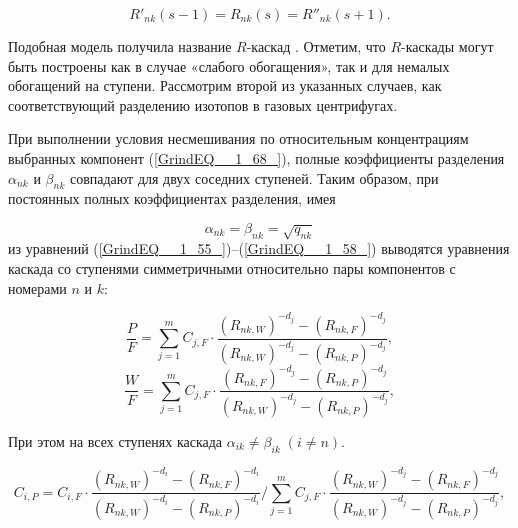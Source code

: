 \begin{equation} \label{GrindEQ__1_68_} 
  R'_{nk} (s-1)=R_{nk} (s)=R''_{nk} (s+1).                                                 
\end{equation} 

Подобная модель получила название $R$-каскад \cite{sulaberidzeTeoriyaKaskadovDlya2011}. Отметим, что $R$-каскады могут быть построены как в случае «слабого обогащения», так и для немалых обогащений на ступени. Рассмотрим второй из указанных случаев, как соответствующий разделению изотопов в газовых центрифугах.

При выполнении условия несмешивания по относительным концентрациям выбранных компонент (\ref{GrindEQ__1_68_}), полные коэффициенты разделения $\alpha _{nk}$ и $\beta _{nk}$ совпадают для двух соседних ступеней. Таким образом, при постоянных полных коэффициентах разделения, имея

\begin{equation} \label{GrindEQ__1_69_} 
  \alpha _{nk} =\beta _{nk} =\sqrt{q_{nk} }  
\end{equation} 
из уравнений (\ref{GrindEQ__1_55_})--(\ref{GrindEQ__1_58_}) выводятся уравнения каскада со ступенями симметричными относительно пары компонентов с номерами $n$ и $k$:
  
\begin{equation} \label{GrindEQ__1_70_} 
  \frac{P}{F} =\sum _{j=1}^{m}C_{j,F} \cdot \frac{(R_{nk,W} )^{-d_{j} } -(R_{nk,F} )^{-d_{j} } }{(R_{nk,W} )^{-d_{j} } -(R_{nk,P} )^{-d_{j} } }  ,                                            
\end{equation} 
\begin{equation} \label{GrindEQ__1_71_} 
  \frac{W}{F} =\sum _{j=1}^{m}C_{j,F} \cdot \frac{(R_{nk,F} )^{-d_{j} } -(R_{nk,P} )^{-d_{j} } }{(R_{nk,W} )^{-d_{j} } -(R_{nk,P} )^{-d_{j} } }  ,                                        
\end{equation} 

При этом на всех ступенях каскада $\alpha _{ik} \ne \beta _{ik} \; (i\ne n)$.

\begin{equation} \label{GrindEQ__1_72_} 
  C_{i,P}=C_{i,F} \cdot \frac{\left(R_{n k,W}\right)^{-d_{i}}-\left(R_{n k,F}\right)^{-d_{i}}}{\left(R_{n k,W}\right)^{-d_{i}}-\left(R_{n k,P}\right)^{-d_{i}}} / \sum_{j=1}^{m} C_{j,F} \cdot \frac{\left(R_{n k,W}\right)^{-d_{j}}-\left(R_{n k,F}\right)^{-d_{j}}}{\left(R_{n k,W}\right)^{-d_{j}}-\left(R_{n k,P}\right)^{-d_{j}}},
\end{equation} 

